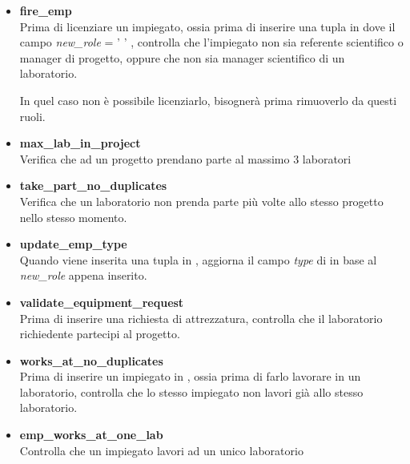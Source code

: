 \begin{itemize}
	\item \textbf{fire\_emp}\\
	      Prima di licenziare un impiegato, ossia prima di inserire una tupla in \textit{\careerlog} dove il campo \textit{new\_role} = ' ' , controlla che l'impiegato non sia referente scientifico o manager di progetto, oppure che non sia manager scientifico di un laboratorio.

	      In quel caso non è possibile licenziarlo, bisognerà prima rimuoverlo da questi ruoli.

	\item \textbf{max\_lab\_in\_project}\\
	      Verifica che ad un progetto prendano parte al massimo $3$ laboratori

	\item \textbf{take\_part\_no\_duplicates}\\
	      Verifica che un laboratorio non prenda parte più volte allo stesso progetto nello stesso momento.

	\item \textbf{update\_emp\_type}\\
	      Quando viene inserita una tupla in \textit{\careerlog}, aggiorna il campo \textit{type} di \textit{\baseemp} in base al \textit{new\_role} appena inserito.

	\item \textbf{validate\_equipment\_request}\\
	      Prima di inserire una richiesta di attrezzatura, controlla che il laboratorio richiedente partecipi al progetto.

	\item \textbf{works\_at\_no\_duplicates}\\
	      Prima di inserire un impiegato in \textit{\worksat}, ossia prima di farlo lavorare in un laboratorio, controlla che lo stesso impiegato non lavori già allo stesso laboratorio.

	\item \textbf{emp\_works\_at\_one\_lab}\\
	      Controlla che un impiegato lavori ad un unico laboratorio
\end{itemize}


